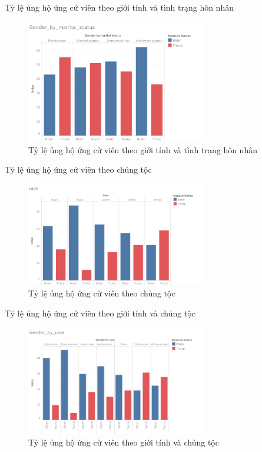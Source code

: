 \documentclass[10pt]{beamer}
\theoremstyle{remark}
\theoremstyle{definition}
\begin{document}
\begin{frame}{Tỷ lệ ủng hộ ứng cử viên theo giới tính và tình trạng hôn nhân}
	\begin{figure}[h!]
        \centering
        \includegraphics[width=0.7\textwidth]{figures/Gender_by_marital_status.png}
        \caption{Tỷ lệ ủng hộ ứng cử viên theo giới tính và tình trạng hôn nhân}
    \end{figure}
\end{frame}

\begin{frame}{Tỷ lệ ủng hộ ứng cử viên theo chủng tộc}
	\begin{figure}[h!]
        \centering
        \includegraphics[width=0.7\textwidth]{figures/race.png}
        \caption{Tỷ lệ ủng hộ ứng cử viên theo chủng tộc}
    \end{figure}
\end{frame}

\begin{frame}{Tỷ lệ ủng hộ ứng cử viên theo giới tính và chủng tộc}
	\begin{figure}[h!]
        \centering
        \includegraphics[width=0.7\textwidth]{figures/Gender_by_race.png}
        \caption{Tỷ lệ ủng hộ ứng cử viên theo giới tính và chủng tộc}
    \end{figure}
\end{frame}
\end{document}
